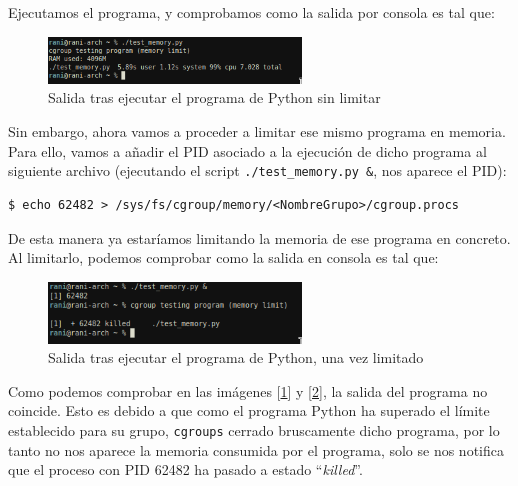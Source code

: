 \documentclass[a4paper, oneside, 12pt]{book}
\begin{document}
	\noindent Ejecutamos el programa, y comprobamos como la salida por consola es tal que: 
	
	\begin{figure}[h!]
		\begin{center}
			\includegraphics[width=0.6\textwidth]{img/cgroup_python1.png}
			\caption{Salida tras ejecutar el programa de Python sin limitar}
			\label{img: cgroup python 1}
		\end{center}
	\end{figure}

	\noindent Sin embargo, ahora vamos a proceder a limitar ese mismo programa en memoria. Para ello, vamos a añadir el PID asociado a la ejecución de dicho programa al siguiente archivo (ejecutando el script \texttt{./test\_memory.py \&}, nos aparece el PID):
	\begin{verbatim}
$ echo 62482 > /sys/fs/cgroup/memory/<NombreGrupo>/cgroup.procs
	\end{verbatim}
	
	\noindent De esta manera ya estaríamos limitando la memoria de ese programa en concreto. Al limitarlo, podemos comprobar como la salida en consola es tal que: 
	
	\begin{figure}[h!]
		\begin{center}
			\includegraphics[width=0.6\textwidth]{img/cgroup_python2.png}
			\caption{Salida tras ejecutar el programa de Python, una vez limitado}
			\label{img: cgroup python 2}
		\end{center}
	\end{figure}

	\pagebreak
	
	\noindent Como podemos comprobar en las imágenes [\ref{img: cgroup python 1}] y [\ref{img: cgroup python 2}], la salida del programa no coincide. Esto es debido a que como el programa Python ha superado el límite establecido para su grupo, \texttt{cgroups} cerrado bruscamente dicho programa, por lo tanto no nos aparece la memoria consumida por el programa, solo se nos notifica que el proceso con PID 62482 ha pasado a estado ``\textit{killed}''. \\
	
\end{document}

